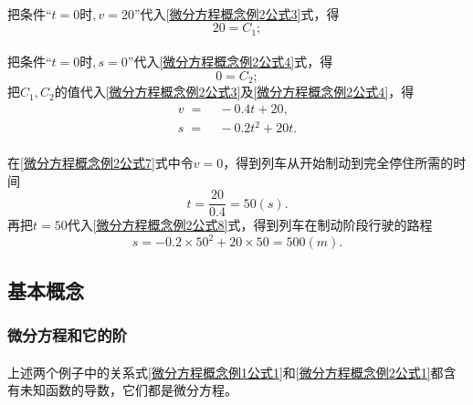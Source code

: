 \paragraph{}
把条件“$t = 0$时$,v=20$”代入\eqref{微分方程概念例2公式3}式，得
\begin{equation}
  \label{微分方程概念例2公式5}
  20 = C_1;
\end{equation}

\paragraph{}
把条件“$t = 0$时$,s=0$”代入\eqref{微分方程概念例2公式4}式，得
\begin{equation}
  \label{微分方程概念例2公式6}
  0 = C_2;
\end{equation}
把$C_1,C_2$的值代入\eqref{微分方程概念例2公式3}及\eqref{微分方程概念例2公式4}，得
\begin{align}
    \label{微分方程概念例2公式7}
    v \;=&\; -0.4t + 20, \\
    \label{微分方程概念例2公式8}
    s \;=&\; -0.2t^2 + 20t.
\end{align}

\paragraph{}
在\eqref{微分方程概念例2公式7}式中令$v=0$，得到列车从开始制动到完全停住所需的时间
\begin{equation}
  \label{微分方程概念例2公式9}
  t = \frac{20}{0.4} = 50(s).
\end{equation}
再把$t=50$代入\eqref{微分方程概念例2公式8}式，得到列车在制动阶段行驶的路程
\begin{equation}
\label{微分方程概念例2公式10}
s = -0.2\times50^2+20\times50=500(m).
\end{equation}

\subsection{基本概念}
\subsubsection{微分方程和它的阶}
\paragraph{}
上述两个例子中的关系式\eqref{微分方程概念例1公式1}和\eqref{微分方程概念例2公式1}都含有未知函数的导数，它们都是微分方程。

